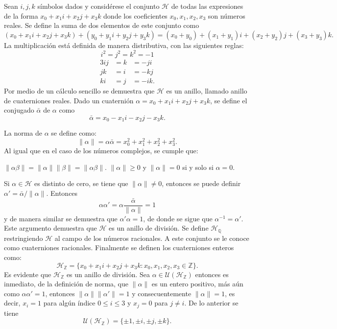 \begin{ejemplo}
Sean $i,j,k$ símbolos dados y considérese el conjunto $\mathcal{H}$ de todas las expresiones de la forma $x_0 + x_1i+x_2j+x_3k$ donde los coeficientes $x_0,x_1,x_2,x_3$ son números reales.
Se define la suma de dos elementos de este conjunto como \[ (x_0 + x_1i+x_2j+x_3k)+(y_0 + y_1i+y_2j+y_3k) = (x_0 + y_0) + (x_1 + y_1)i + (x_2+y_2)j + (x_3+y_3)k.  \] La multiplicación está definida de manera distributiva, con las siguientes reglas:
\begin{equation*}
i^2 = j^2 = k^2 =-1
\end{equation*}
\vspace*{-5.1em}
\begin{alignat*}{3}
ij &= k &= -ji\\
jk &= i &= -kj\\
ki &= j &= -ik.
\end{alignat*}
 \indent Por medio de un cálculo sencillo se demuestra que $\mathcal{H}$ es un anillo, llamado anillo de cuaterniones reales. Dado un cuaternión $\alpha = x_0 + x_1i + x_2j + x_3k$, se define el conjugado $\bar{\alpha}$ de $\alpha$ como \[ \bar{\alpha} = x_0-x_1i - x_2j-x_3k. \] 
 
 La norma de $\alpha$ se define como: \[ \lVert \alpha \rVert = \alpha\bar{\alpha} = x_0 ^2 + x_1^2 + x_ 2^2 + x_ 3^2. \]
Al igual que en el caso de los números complejos, se cumple que:
\begin{bulletList}
\newItem $\lVert \alpha\beta \rVert = \lVert \alpha \rVert \lVert \beta \rVert = \lVert \alpha\beta \rVert$.
\newItem $\lVert \alpha \rVert \geq 0$ y $\lVert \alpha \rVert  = 0 $ si y solo si $\alpha = 0 $.
\end{bulletList}

Si $\alpha \in \mathcal{H}$ es distinto de cero, se tiene que $\lVert \alpha \rVert \neq 0$, entonces se puede definir $\alpha' = \bar{\alpha}/\lVert \alpha \rVert$. Entonces \[ \alpha\alpha'= \alpha \frac{\bar{\alpha}}{\lVert \alpha \rVert} = 1 \] y de manera similar se demuestra que $\alpha'\alpha = 1$, de donde se sigue que $\alpha^{-1} = \alpha'$. Este argumento demuestra que $\mathcal{H}$ es un anillo de división.
Se define $\mathcal{H}_{\mathds{Q}}$ restringiendo $\mathcal{H}$ al campo de los números racionales. A este conjunto se le conoce como cuaterniones racionales.
Finalmente se definen los cuaterniones enteros como: \[ \mathcal{H}_{\mathds{Z}} = \{ x_0 + x_1i + x_2j + x_3k \colon x_0, x_1, x_2, x_3 \in \mathds{Z} \}. \]
\indent Es evidente que $\mathcal{H}_{\mathds{Z}}$ es un anillo de división.
Sea $\alpha \in \mathcal{U}(\mathcal{H}_{\mathds{Z}})$ entonces es inmediato, de la definición de norma, que $\lVert \alpha \rVert$ es un entero positivo, más aún como $\alpha\alpha'= 1$, entonces $\lVert \alpha \rVert \lVert \alpha'\rVert = 1$ y consecuentemente $\lVert \alpha \rVert = 1$, es decir, $x_i = 1$ para algún índice $0\leq i \leq 3 $ y $x_j = 0 $ para $j \neq i$. De lo anterior se tiene \[ \mathcal{U}(\mathcal{H}_{\mathds{Z}}) = \{ \pm1, \pm i, \pm j, \pm k \}. \] 
\end{ejemplo} 

